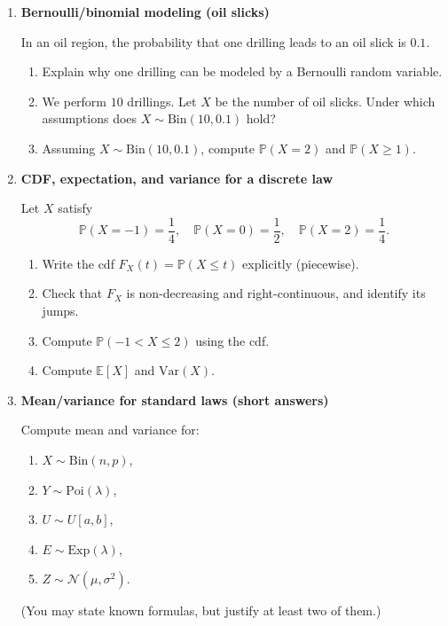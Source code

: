 \documentclass[11pt]{article}
\begin{document}
\begin{enumerate}[leftmargin=*, itemsep=1.2em]
\bigskip

\item \textbf{Bernoulli/binomial modeling (oil slicks)}

In an oil region, the probability that one drilling leads to an oil slick is $0.1$.
\begin{enumerate}[label=(\alph*)]
\item Explain why one drilling can be modeled by a Bernoulli random variable.
\item We perform $10$ drillings. Let $X$ be the number of oil slicks.
Under which assumptions does $X\sim\mathrm{Bin}(10,0.1)$ hold?
\item Assuming $X\sim\mathrm{Bin}(10,0.1)$, compute $\mathbb{P}(X=2)$ and $\mathbb{P}(X\ge1)$.
\end{enumerate}

\bigskip

\item \textbf{CDF, expectation, and variance for a discrete law}

Let $X$ satisfy
\[
\mathbb{P}(X=-1)=\frac14,\quad
\mathbb{P}(X=0)=\frac12,\quad
\mathbb{P}(X=2)=\frac14.
\]
\begin{enumerate}[label=(\alph*)]
\item Write the cdf $F_X(t)=\mathbb{P}(X\le t)$ explicitly (piecewise).
\item Check that $F_X$ is non-decreasing and right-continuous, and identify its jumps.
\item Compute $\mathbb{P}(-1<X\le2)$ using the cdf.
\item Compute $\mathbb{E}[X]$ and $\mathrm{Var}(X)$.
\end{enumerate}

\bigskip

\item \textbf{Mean/variance for standard laws (short answers)}

Compute mean and variance for:
\begin{enumerate}[label=(\alph*)]
\item $X\sim \mathrm{Bin}(n,p)$,
\item $Y\sim \mathrm{Poi}(\lambda)$,
\item $U\sim U[a,b]$,
\item $E\sim \mathrm{Exp}(\lambda)$,
\item $Z\sim \mathcal{N}(\mu,\sigma^2)$.
\end{enumerate}
(You may state known formulas, but justify at least two of them.)


\end{enumerate}
\end{document}
